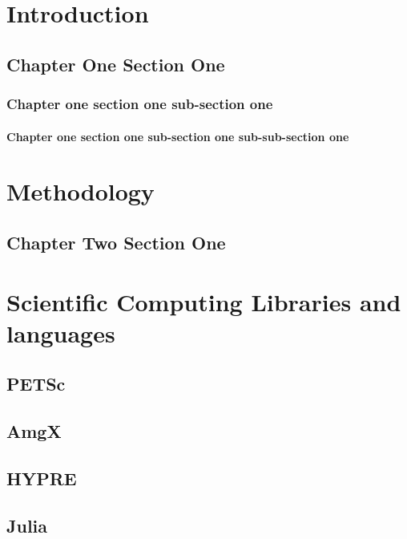 \chapter{Introduction}
\section{Chapter One Section One}
\subsection{Chapter one section one sub-section one}

\subsubsection{Chapter one section one sub-section one sub-sub-section one}

\chapter{Methodology}
\section{Chapter Two Section One}


\chapter{Scientific Computing Libraries and languages}
\section{PETSc}

\section{AmgX}

\section{HYPRE}


\section{Julia}



